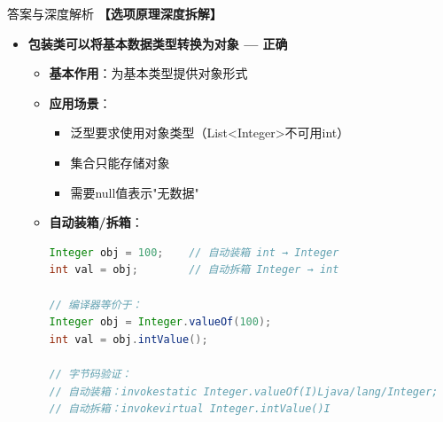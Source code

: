 \documentclass[12pt, a4paper]{ctexart}
\begin{document}
\begin{enumerate}[label=\textbf{\arabic*.}]
\begin{bluebox}{答案与深度解析}
		      \textbf{【选项原理深度拆解】}

		      \begin{itemize}[leftmargin=*, nosep, label={}]
			      \item[A] \textbf{包装类可以将基本数据类型转换为对象 — 正确}
			            \begin{itemize}[label={}, leftmargin=*, nosep]
				            \item \textbf{基本作用}：为基本类型提供对象形式
				            \item \textbf{应用场景}：
				                  \begin{itemize}[label={}, nosep]
					                  \item 泛型要求使用对象类型（List<Integer>不可用int）
					                  \item 集合只能存储对象
					                  \item 需要null值表示"无数据"
				                  \end{itemize}
				            \item \textbf{自动装箱/拆箱}：
				                  \begin{lstlisting}[language=Java]
Integer obj = 100;    // 自动装箱 int → Integer
int val = obj;        // 自动拆箱 Integer → int

// 编译器等价于：
Integer obj = Integer.valueOf(100);
int val = obj.intValue();

// 字节码验证：
// 自动装箱：invokestatic Integer.valueOf(I)Ljava/lang/Integer;
// 自动拆箱：invokevirtual Integer.intValue()I
				            \end{lstlisting}
			            \end{itemize}


\end{itemize}
\end{bluebox}
\end{enumerate}
\end{document}
